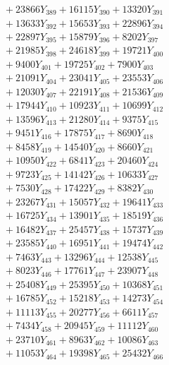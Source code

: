 \documentclass[a4paper,10pt]{article}
\begin{document}
{\begin{align}
&\;  + 23866 Y_{389} + 16115 Y_{390} + 13320 Y_{391} \\[0.3ex]
&\;  + 13633 Y_{392} + 15653 Y_{393} + 22896 Y_{394} \\[0.3ex]
&\;  + 22897 Y_{395} + 15879 Y_{396} + 8202 Y_{397} \\[0.3ex]
&\;  + 21985 Y_{398} + 24618 Y_{399} + 19721 Y_{400} \\[0.3ex]
&\;  + 9400 Y_{401} + 19725 Y_{402} + 7900 Y_{403} \\[0.3ex]
&\;  + 21091 Y_{404} + 23041 Y_{405} + 23553 Y_{406} \\[0.3ex]
&\;  + 12030 Y_{407} + 22191 Y_{408} + 21536 Y_{409} \\[0.3ex]
&\;  + 17944 Y_{410} + 10923 Y_{411} + 10699 Y_{412} \\[0.3ex]
&\;  + 13596 Y_{413} + 21280 Y_{414} + 9375 Y_{415} \\[0.3ex]
&\;  + 9451 Y_{416} + 17875 Y_{417} + 8690 Y_{418} \\[0.5ex]\allowbreak
&\;  + 8458 Y_{419} + 14540 Y_{420} + 8660 Y_{421} \\[0.3ex]
&\;  + 10950 Y_{422} + 6841 Y_{423} + 20460 Y_{424} \\[0.3ex]
&\;  + 9723 Y_{425} + 14142 Y_{426} + 10633 Y_{427} \\[0.3ex]
&\;  + 7530 Y_{428} + 17422 Y_{429} + 8382 Y_{430} \\[0.3ex]
&\;  + 23267 Y_{431} + 15057 Y_{432} + 19641 Y_{433} \\[0.3ex]
&\;  + 16725 Y_{434} + 13901 Y_{435} + 18519 Y_{436} \\[0.3ex]
&\;  + 16482 Y_{437} + 25457 Y_{438} + 15737 Y_{439} \\[0.3ex]
&\;  + 23585 Y_{440} + 16951 Y_{441} + 19474 Y_{442} \\[0.3ex]
&\;  + 7463 Y_{443} + 13296 Y_{444} + 12538 Y_{445} \\[0.3ex]
&\;  + 8023 Y_{446} + 17761 Y_{447} + 23907 Y_{448} \\[0.5ex]\allowbreak
&\;  + 25408 Y_{449} + 25395 Y_{450} + 10368 Y_{451} \\[0.3ex]
&\;  + 16785 Y_{452} + 15218 Y_{453} + 14273 Y_{454} \\[0.3ex]
&\;  + 11113 Y_{455} + 20277 Y_{456} + 6611 Y_{457} \\[0.3ex]
&\;  + 7434 Y_{458} + 20945 Y_{459} + 11112 Y_{460} \\[0.3ex]
&\;  + 23710 Y_{461} + 8963 Y_{462} + 10086 Y_{463} \\[0.3ex]
&\;  + 11053 Y_{464} + 19398 Y_{465} + 25432 Y_{466} \\[0.3ex]

\end{align}}
\end{document}
